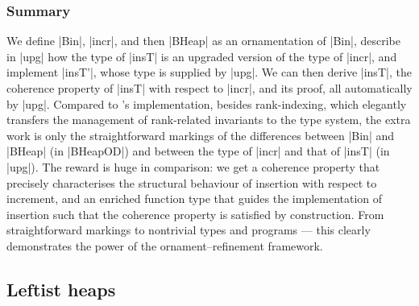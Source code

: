 \subsubsection{Summary}

We define |Bin|, |incr|, and then |BHeap| as an ornamentation of |Bin|, describe in |upg| how the type of |insT| is an upgraded version of the type of |incr|, and implement |insT'|, whose type is supplied by |upg|.
We can then derive |insT|, the coherence property of |insT| with respect to |incr|, and its proof, all automatically by |upg|.
Compared to \citeauthor{Okasaki-data-structures}'s implementation, besides rank-indexing, which elegantly transfers the management of rank-related invariants to the type system, the extra work is only the straightforward markings of the differences between |Bin| and |BHeap| (in |BHeapOD|) and between the type of |incr| and that of |insT| (in |upg|).
The reward is huge in comparison: we get a coherence property that precisely characterises the structural behaviour of insertion with respect to increment, and an enriched function type that guides the implementation of insertion such that the coherence property is satisfied by construction.
From straightforward markings to nontrivial types and programs --- this clearly demonstrates the power of the ornament--refinement framework.

\subsection{Leftist heaps}

